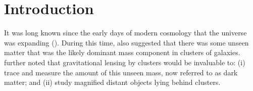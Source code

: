 \documentclass[twocolumn,linenumbers]{aastex631}
\begin{document}


\section{Introduction} \label{sec:intro}
It was long known since the early days of modern cosmology that the universe was expanding (\cite{1929PNAS...15..168H, 1931MNRAS..91..483L, hubble1931velocity}). During this time, \cite{zwicky1933rotverschiebung} also suggested that there was some unseen matter that was the likely dominant mass component in clusters of galaxies. \cite{zwicky1937nebulae} further noted that gravitational lensing by clusters would be invaluable to: (i) trace and measure the amount of this unseen mass, now referred to as dark matter; and (ii) study magnified distant objects lying behind clusters.
\end{document}
